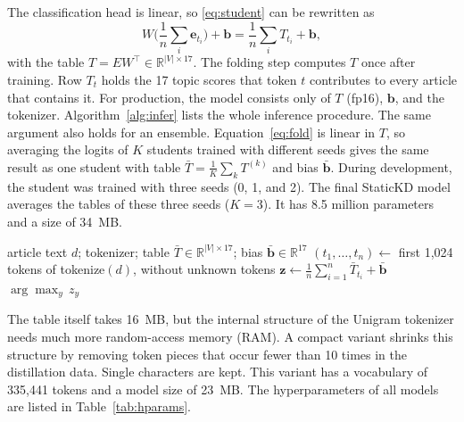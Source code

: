 \documentclass[journal]{IEEEtran}
\begin{document}
The classification head is linear, so \eqref{eq:student} can be rewritten as
\begin{equation}
W\Big(\frac{1}{n}\sum_{i}\mathbf{e}_{t_i}\Big)+\mathbf{b}=\frac{1}{n}\sum_{i}T_{t_i}+\mathbf{b},
\label{eq:fold}
\end{equation}
with the table $T=EW^{\top}\in\mathbb{R}^{|V|\times 17}$. The folding step computes $T$ once after training. Row $T_t$ holds the 17 topic scores that token $t$ contributes to every article that contains it. For production, the model consists only of $T$ (fp16), $\mathbf{b}$, and the tokenizer. Algorithm~\ref{alg:infer} lists the whole inference procedure. The same argument also holds for an ensemble. Equation~\eqref{eq:fold} is linear in $T$, so averaging the logits of $K$ students trained with different seeds gives the same result as one student with table $\bar{T}=\frac{1}{K}\sum_k T^{(k)}$ and bias $\bar{\mathbf{b}}$. During development, the student was trained with three seeds (0, 1, and 2). The final StaticKD model averages the tables of these three seeds ($K=3$). It has 8.5 million parameters and a size of 34~MB.

\begin{algorithm}[!t]
\caption{StaticKD Inference for One Article}
\label{alg:infer}
\begin{algorithmic}[1]
\Require article text $d$; tokenizer; table $\bar{T}\in\mathbb{R}^{|V|\times 17}$; bias $\bar{\mathbf{b}}\in\mathbb{R}^{17}$
\State $(t_1,\dots,t_n)\gets$ first 1,024 tokens of tokenize$(d)$, without unknown tokens
\State $\mathbf{z}\gets\frac{1}{n}\sum_{i=1}^{n}\bar{T}_{t_i}+\bar{\mathbf{b}}$ 
\State \Return $\arg\max_{y}\,z_y$ 
\end{algorithmic}
\end{algorithm}

The table itself takes 16~MB, but the internal structure of the Unigram tokenizer needs much more random-access memory (RAM). A compact variant shrinks this structure by removing token pieces that occur fewer than 10 times in the distillation data. Single characters are kept. This variant has a vocabulary of 335,441 tokens and a model size of 23~MB. The hyperparameters of all models are listed in Table~\ref{tab:hparams}.
\end{document}
